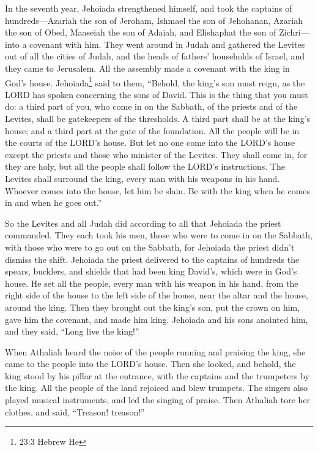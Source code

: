  In the seventh year, Jehoiada strengthened himself, and
took the captains of hundreds---Azariah the son of Jeroham, Ishmael the
son of Jehohanan, Azariah the son of Obed, Maaseiah the son of Adaiah,
and Elishaphat the son of Zichri---into a covenant with him.
 They went around in Judah and gathered the Levites out of
all the cities of Judah, and the heads of fathers' households of Israel,
and they came to Jerusalem.  All the assembly made a
covenant with the king in God's house. Jehoiada\footnote{23:3 Hebrew He}
said to them, ``Behold, the king's son must reign, as the LORD has
spoken concerning the sons of David.  This is the thing that
you must do: a third part of you, who come in on the Sabbath, of the
priests and of the Levites, shall be gatekeepers of the thresholds.
 A third part shall be at the king's house; and a third part
at the gate of the foundation. All the people will be in the courts of
the LORD's house.  But let no one come into the LORD's house
except the priests and those who minister of the Levites. They shall
come in, for they are holy, but all the people shall follow the LORD's
instructions.  The Levites shall surround the king, every
man with his weapons in his hand. Whoever comes into the house, let him
be slain. Be with the king when he comes in and when he goes out.''

 So the Levites and all Judah did according to all that
Jehoiada the priest commanded. They each took his men, those who were to
come in on the Sabbath, with those who were to go out on the Sabbath,
for Jehoiada the priest didn't dismiss the shift.  Jehoiada
the priest delivered to the captains of hundreds the spears, bucklers,
and shields that had been king David's, which were in God's house.
 He set all the people, every man with his weapon in his
hand, from the right side of the house to the left side of the house,
near the altar and the house, around the king.  Then they
brought out the king's son, put the crown on him, gave him the covenant,
and made him king. Jehoiada and his sons anointed him, and they said,
``Long live the king!''

 When Athaliah heard the noise of the people running and
praising the king, she came to the people into the LORD's house.
 Then she looked, and behold, the king stood by his pillar
at the entrance, with the captains and the trumpeters by the king. All
the people of the land rejoiced and blew trumpets. The singers also
played musical instruments, and led the singing of praise. Then Athaliah
tore her clothes, and said, ``Treason! treason!''

